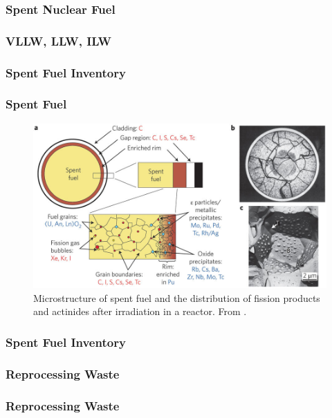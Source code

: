 
\begin{frame}[c]
  \frametitle{Spent Nuclear Fuel}
  
\end{frame}

\begin{frame}[fragile]
        \frametitle{VLLW, LLW, ILW}
                
\end{frame}

\begin{frame}[fragile]
        \frametitle{Spent Fuel Inventory}
                
\end{frame}

\begin{frame}[fragile]
        \frametitle{Spent Fuel}
        \begin{figure}
        \includegraphics[width=\textwidth]{./images/ewing-microstructure}
                \caption{Microstructure of spent fuel and the distribution of
                fission products and actinides after irradiation in a reactor.
                From \cite{ewing_long-term_2016}.}
        \end{figure}
\end{frame}

\begin{frame}[fragile]
        \frametitle{Spent Fuel Inventory}
                
\end{frame}


\begin{frame}[fragile]
        \frametitle{Reprocessing Waste}
                
\end{frame}

\begin{frame}[fragile]
        \frametitle{Reprocessing Waste}
                
\end{frame}

